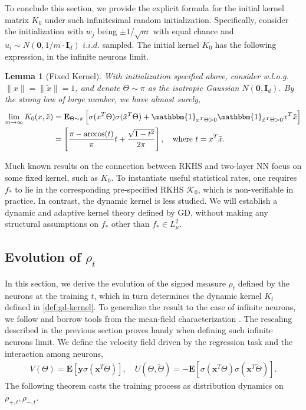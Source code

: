 \documentclass[11pt]{article}
\numberwithin{equation}{section}
\newtheorem{lemma}{Lemma}[section]
\def\bd#1{\mathbf{#1}}
\def\bx{\bd{x}}
\begin{document}
To conclude this section, we provide the explicit formula for the initial kernel matrix $K_0$ under such infinitesimal random initialization.
Specifically, consider the initialization with $w_j$ being $\pm 1/\sqrt{m}$ with equal chance and $u_i \sim N(\mathbf{0},1/m \cdot \bd{I}_d)$ $i.i.d.$ sampled. The initial kernel $K_0$ has the following expression, in the infinite neurons limit.
\begin{lemma}[Fixed Kernel]
    \label{lem:K_0}
With initialization specified above, consider w.l.o.g. $\|x\| = \|\tilde  x\|=1$, and denote $\Theta \sim \pi$ as the isotropic Gaussian $N(\mathbf{0}, \mathbf{I}_d)$. By the strong law of large number, we have almost surely, 
\begin{align*}
    \lim_{m \rightarrow \infty} K_0(x,\tilde x) &=   \mathbf{E}_{\Theta \sim \pi}\left[ \sigma(x^T\Theta)\sigma(\tilde x^T\Theta) + \mathbbm{1}_{x^T \Theta>0}\mathbbm{1}_{\tilde x^T \Theta>0}x^T\tilde x\right]\\
    &=  \left[ \frac{\pi - \arccos(t)}{\pi} t + \frac{\sqrt{1-t^2}}{2\pi}  \right], \quad\text{where $t = x^T\tilde  x$}.
\end{align*}
\end{lemma}
Much known results \citep{bengio2006convex, rahimi2008random, bach2017breaking, cho2009kernel, daniely2016toward} on the connection between RKHS and two-layer NN focus on some fixed kernel, such as $K_0$. To instantiate useful statistical rates, one requires $f_*$ to lie in the corresponding pre-specified RKHS $\mathcal{K}_0$, which is non-verifiable in practice. In contrast, the dynamic kernel is less studied. We will establish a dynamic and adaptive kernel theory defined by GD, without making any structural assumptions on $f_*$ other than $f_* \in L^2_\mu$.
        
        
        
\subsection{Evolution of $\rho_t$}
\label{sec:pde-char}


In this section, we derive the evolution of the signed measure $\rho_t$ defined by the neurons at the training $t$, which in turn determines the dynamic kernel $K_t$ defined in \eqref{def:gd-kernel}. To generalize the result to the case of infinite neurons, we follow and borrow tools from the mean-field characterization \citep{mei2018mean, rotskoff2018neural, jordan1998variational}. The rescaling described in the previous section proves handy when defining such infinite neurons limit. 
We define the velocity field driven by the regression task and the interaction among neurons,
\begin{align}
    \label{eq:velocity} 
    V(\Theta) = \mathbf{E}[\bd{y}\sigma(\bx^T\Theta)], \quad 
    U(\Theta,\tilde{\Theta}) = -\mathbf{E}[\sigma(\bx^T\Theta)\sigma(\bx^T\tilde{\Theta})].
\end{align}
The following theorem casts the training process as distribution dynamics on $\rho_{+, t},\rho_{-, t}$. 
\end{document}
